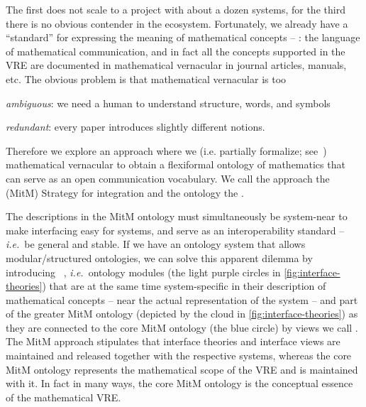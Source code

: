 The first does not scale to a project with about a dozen systems, for the third there is
no obvious contender in the \ODK ecosystem. Fortunately, we already have a ``standard''
for expressing the meaning of mathematical concepts -- :
the language of mathematical communication, and in fact all the concepts supported in the
\ODK VRE are documented in mathematical vernacular in journal articles, manuals, etc.
The obvious problem is that mathematical vernacular is too
\begin{inparaenum}[\em i\rm)]
\item \emph{ambiguous}: we need a human to understand structure, words, and symbols
\item \emph{redundant}: every paper introduces slightly different notions. 
\end{inparaenum}

Therefore we explore an approach where we  (i.e. partially formalize;
see~\cite{Kohlhase:tffm13}) mathematical vernacular to obtain a flexiformal ontology of
mathematics that can serve as an open communication vocabulary. We call the approach the
 (MitM) Strategy for integration and the ontology the .

The descriptions in the MitM ontology must simultaneously be system-near to make
interfacing easy for systems, and serve as an interoperability standard -- \emph{i.e.}\ be
general and stable. If we have an ontology system that allows modular/structured
ontologies, we can solve this apparent dilemma by introducing ~\cite{KohRabSac:fvip11}, \emph{i.e.}\ ontology modules (the light purple
circles in \autoref{fig:interface-theories}) that are at the same time system-specific
in their description of mathematical concepts -- near the actual representation of the
system -- and part of the greater MitM ontology (depicted by the cloud in
\autoref{fig:interface-theories}) as they are connected to the core MitM ontology (the
blue circle) by views we call .  The MitM approach stipulates
that interface theories and interface views are maintained and released together with the
respective systems, whereas the core MitM ontology represents the mathematical scope of
the VRE and is maintained with it. In fact in many ways, the core MitM ontology is the
conceptual essence of the mathematical VRE.


